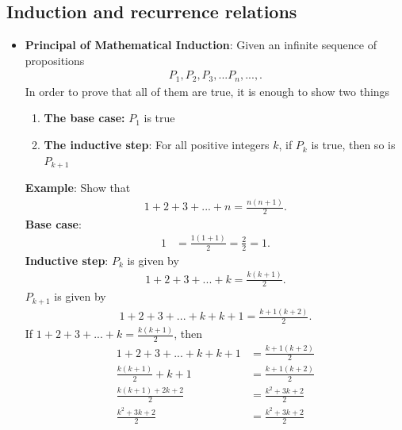 \documentclass{report}
\begin{document}
    \subsection{Induction and recurrence relations}
    \begin{itemize}
        \item \textbf{Principal of Mathematical Induction}: Given an infinite sequence of propositions
            \begin{align*}
                P_{1}, P_{2}, P_{3},...P_{n},...,
            .\end{align*}
            In order to prove that all of them are true, it is enough to show two things
            \begin{enumerate}
                \item \textbf{The base case:} $P_{1}$ is true
                \item \textbf{The inductive step}: For all positive integers $k$, if $P_{k}$ is true, then so is $P_{k+1}$
            \end{enumerate}
            \bigbreak \noindent 
            \textbf{Example}: Show that 
            \begin{align*}
                1 + 2 + 3 + ... + n = \frac{n(n+1)}{2}
            .\end{align*}
            \textbf{Base case}:
            \begin{align*}
                1 &= \frac{1(1+1)}{2} = \frac{2}{2} = 1
            .\end{align*}
            \bigbreak \noindent 
            \textbf{Inductive step}: $P_{k}$ is given by
            \begin{align*}
                1 + 2 + 3 + ... + k = \frac{k(k+1)}{2}
            .\end{align*}
            \bigbreak \noindent 
            $P_{k+1}$ is given by
            \begin{align*}
                1 + 2 + 3 + ... + k + k+1 = \frac{k+1(k+2)}{2}
            .\end{align*}
            If $1+2+3+...+k  = \frac{k(k+1)}{2}$, then
            \begin{align*}
                1 + 2 + 3 + ... + k + k+1 &= \frac{k+1(k+2)}{2} \\
                \frac{k(k+1)}{2} + k + 1 &= \frac{k+1(k+2)}{2} \\
                \frac{k(k+1) + 2k + 2}{2} &= \frac{k^{2} + 3k + 2}{2} \\
                \frac{k^{2} + 3k  + 2}{2} &= \frac{k^{2} + 3k + 2}{2}

\end{align*}
\end{itemize}
\end{document}
